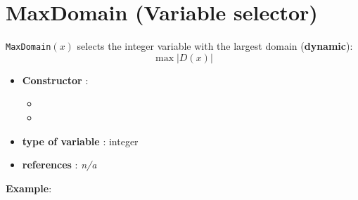 \section{MaxDomain (Variable selector)}\label{maxdomain:maxdomainvarselector}\hypertarget{maxdomain:maxdomainvarselector}{}
\begin{notedef}
  \texttt{MaxDomain}$(x)$ selects the integer variable with the largest domain (\textbf{dynamic}):
$$\max |D(x)|$$
\end{notedef}

\begin{itemize}
	\item \textbf{Constructor} : 
	\begin{itemize}
	\item {}
	\item {}
	\end{itemize}	
	\item \textbf{type of variable} : integer
	\item \textbf{references} : \emph{n/a}
\end{itemize}

\textbf{Example}:
%

